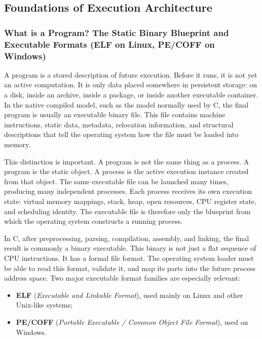 \subsection{Foundations of Execution Architecture}
\subsubsection{What is a Program? The Static Binary Blueprint and Executable Formats (ELF on Linux, PE/COFF on Windows)}

A program is a stored description of future execution. Before it runs, it is not yet an active computation. It is only data placed somewhere in persistent storage: on a disk, inside an archive, inside a package, or inside another executable container. In the native compiled model, such as the model normally used by C, the final program is usually an executable binary file. This file contains machine instructions, static data, metadata, relocation information, and structural descriptions that tell the operating system how the file must be loaded into memory.

This distinction is important. A program is not the same thing as a process. A program is the static object. A process is the active execution instance created from that object. The same executable file can be launched many times, producing many independent processes. Each process receives its own execution state: virtual memory mappings, stack, heap, open resources, CPU register state, and scheduling identity. The executable file is therefore only the blueprint from which the operating system constructs a running process.

In C, after preprocessing, parsing, compilation, assembly, and linking, the final result is commonly a binary executable. This binary is not just a flat sequence of CPU instructions. It has a formal file format. The operating system loader must be able to read this format, validate it, and map its parts into the future process address space. Two major executable format families are especially relevant:

\begin{itemize}
    \item \textbf{ELF} (\emph{Executable and Linkable Format}), used mainly on Linux and other Unix-like systems;
    \item \textbf{PE/COFF} (\emph{Portable Executable / Common Object File Format}), used on Windows.
\end{itemize}

